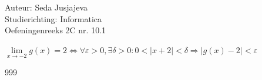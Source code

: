 \documentclass[a4paper]{article}
\begin{document}
\noindent \large Auteur: Seda Jusjajeva\\
\noindent \large Studierichting: Informatica\\
\noindent \large Oefeningenreeks 2C nr. 10.1 \\

\medskip

\normalsize

$\lim\limits_{x\rightarrow -2}g(x) = 2 \Leftrightarrow \forall\varepsilon > 0, \exists\delta > 0 : 0 < \lvert x + 2\rvert < \delta \Rightarrow \lvert g(x) - 2\rvert < \varepsilon$ \\



\begin{thebibliography}{999}
\end{thebibliography}
\end{document}
